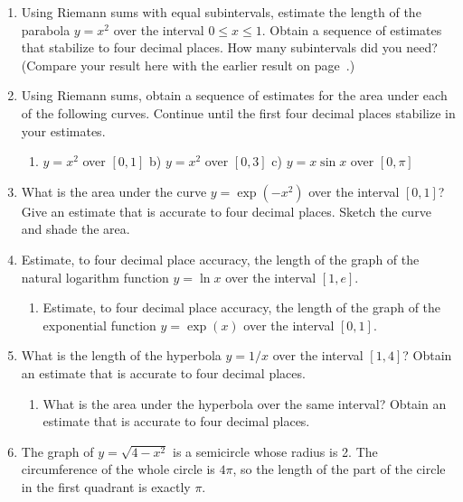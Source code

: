 \begin{enumerate}
\item Using Riemann sums with equal subintervals, estimate the length
of the parabola $y = x^2$ over the interval $0 \leq x \leq 1$.  Obtain
a sequence of estimates that stabilize to four decimal places.  How
many subintervals did you need?  (Compare your result here with the
earlier result on page~\pageref{successive lengths}.)


\item Using Riemann sums, obtain a sequence of estimates for the area
under each of the following curves.  Continue until the first four
decimal places stabilize in your estimates.

  \begin{enumerate}
  \item $y = x^2$ over $[0, 1]$ \hfill
b) $y = x^2$ over $[0, 3]$ \hfill
c) $y = x \sin{x}$ over $[0, \pi]$ 


\end{enumerate}
\item What is the area under the curve $y = \exp(-x^2)$ over the
interval $[0, 1]$?  Give an estimate that is accurate to four decimal
places.  Sketch the curve and shade the area.


\item Estimate, to four decimal place accuracy, the length of the
graph of the natural logarithm function $y = \ln{x}$ over the interval
$[1, e]$.

  \begin{enumerate}
  \item Estimate, to four decimal place accuracy, the length of the graph
of the exponential function $y = \exp(x)$ over the interval $[0, 1]$.


\end{enumerate}
\item What is the length of the hyperbola $y = 1/x$ over the interval
$[1, 4]$?  Obtain an estimate that is accurate to four decimal places.

  \begin{enumerate}
  \item What is the area under the hyperbola over the same interval?
Obtain an estimate that is accurate to four decimal places.


\end{enumerate}
\item The graph of $y = \sqrt{4 - x^2}$ is a semicircle whose radius is
2.  The circumference of the whole circle is $4\pi$, so the length of
the part of the circle in the first quadrant is exactly $\pi$.


\end{enumerate}
